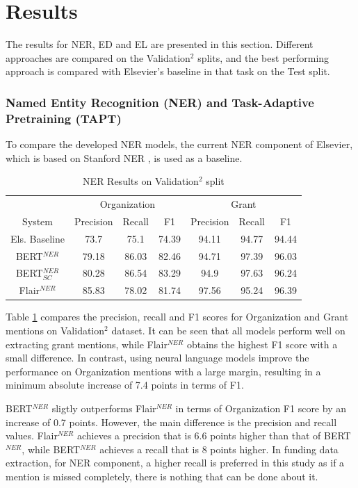 \documentclass{report}
\theoremstyle{definition}
\theoremstyle{remark}
\begin{document}
\section{Results}
\label{sec:EvalResults}
The results for NER, ED and EL are presented in this section. Different approaches are compared on the Validation$^2$ splits, and the best performing approach is compared with Elsevier's baseline in that task on the Test split.
\subsubsection{Named Entity Recognition (NER) and Task-Adaptive Pretraining (TAPT)}
To compare the developed NER models, the current NER component of Elsevier, which is based on Stanford NER \cite{stanfordNER},  is used as a baseline.

\begin{table}
    \centering
    \begin{tabular}{c| c c c| c c c}
    &\multicolumn{3}{c|}{Organization}&\multicolumn{3}{c}{Grant} \\
    System&Precision&Recall&F1&Precision&Recall&F1\\
    \hline
    Els. Baseline & 73.7&	75.1&74.39&94.11&94.77&94.44
 \\[0.7ex]
    BERT$^{NER}$ & 79.18&86.03&82.46&94.71&97.39&96.03
\\[0.7ex]
    BERT$^{NER}_{SC}$ & 80.28&86.54&83.29&94.9	&97.63&96.24
  \\[0.7ex]
    Flair$^{NER}$& 85.83&78.02&81.74&97.56&95.24&96.39
 \\[0.7ex]
    \end{tabular}
    \caption{NER Results on Validation$^2$ split}
    \label{tab:all_ner_results}
\end{table}

Table \ref{tab:all_ner_results} compares the precision, recall and F1 scores for Organization and Grant mentions on Validation$^2$ dataset. It can be seen that all models perform well on extracting grant mentions, while Flair$^{NER}$ obtains the highest F1 score with a small difference. In contrast, using neural language models improve the performance on Organization mentions with a large margin, resulting in a minimum absolute increase of 7.4 points in terms of F1.

BERT$^{NER}$ sligtly outperforms Flair$^{NER}$ in terms of Organization F1 score by an increase of 0.7 points. However, the main difference is the precision and recall values. Flair$^{NER}$ achieves a precision that is 6.6 points higher than that of BERT$^{NER}$, while BERT$^{NER}$ achieves a recall that is 8 points higher. In funding data extraction, for NER component, a higher recall is preferred in this study as if a mention is missed completely, there is nothing that can be done about it.
\end{document}
